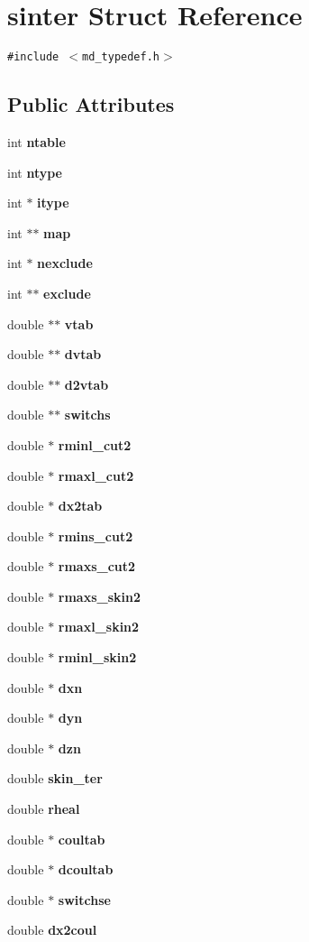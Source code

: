 \section{sinter Struct Reference}
\label{structsinter}
{\tt \#include $<$md\_\-typedef.h$>$}

\subsection*{Public Attributes}
\begin{CompactItemize}
\item 
int {\bf ntable}
\item 
int {\bf ntype}
\item 
int $\ast$ {\bf itype}
\item 
int $\ast$$\ast$ {\bf map}
\item 
int $\ast$ {\bf nexclude}
\item 
int $\ast$$\ast$ {\bf exclude}
\item 
double $\ast$$\ast$ {\bf vtab}
\item 
double $\ast$$\ast$ {\bf dvtab}
\item 
double $\ast$$\ast$ {\bf d2vtab}
\item 
double $\ast$$\ast$ {\bf switchs}
\item 
double $\ast$ {\bf rminl\_\-cut2}
\item 
double $\ast$ {\bf rmaxl\_\-cut2}
\item 
double $\ast$ {\bf dx2tab}
\item 
double $\ast$ {\bf rmins\_\-cut2}
\item 
double $\ast$ {\bf rmaxs\_\-cut2}
\item 
double $\ast$ {\bf rmaxs\_\-skin2}
\item 
double $\ast$ {\bf rmaxl\_\-skin2}
\item 
double $\ast$ {\bf rminl\_\-skin2}
\item 
double $\ast$ {\bf dxn}
\item 
double $\ast$ {\bf dyn}
\item 
double $\ast$ {\bf dzn}
\item 
double {\bf skin\_\-ter}
\item 
double {\bf rheal}
\item 
double $\ast$ {\bf coultab}
\item 
double $\ast$ {\bf dcoultab}
\item 
double $\ast$ {\bf switchse}
\item 
double {\bf dx2coul}

\end{CompactItemize}
